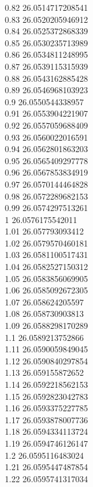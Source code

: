 {0.82	26.0514717208541\\
0.83	26.0520205946912\\
0.84	26.0525372868339\\
0.85	26.0530235713989\\
0.86	26.0534811248995\\
0.87	26.0539115315939\\
0.88	26.0543162885428\\
0.89	26.0546968103923\\
0.9	26.0550544338957\\
0.91	26.0553904221907\\
0.92	26.0557059688409\\
0.93	26.0560022016591\\
0.94	26.0562801863203\\
0.95	26.0565409297778\\
0.96	26.0567853834919\\
0.97	26.0570144464828\\
0.98	26.0572289682153\\
0.99	26.0574297513261\\
1	26.0576175542011\\
1.01	26.057793093412\\
1.02	26.0579570460181\\
1.03	26.0581100517431\\
1.04	26.0582527150312\\
1.05	26.0583856069905\\
1.06	26.0585092672305\\
1.07	26.058624205597\\
1.08	26.058730903813\\
1.09	26.0588298170289\\
1.1	26.0589213752866\\
1.11	26.0590059849045\\
1.12	26.0590840297854\\
1.13	26.059155872652\\
1.14	26.0592218562153\\
1.15	26.0592823042783\\
1.16	26.0593375227785\\
1.17	26.0593878007736\\
1.18	26.0594334113724\\
1.19	26.0594746126147\\
1.2	26.0595116483024\\
1.21	26.0595447487854\\
1.22	26.0595741317034\\
}
